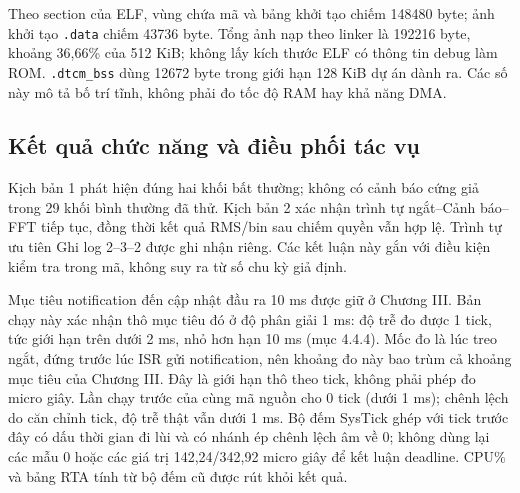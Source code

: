 \documentclass[12pt,a4paper,oneside]{report}
\begin{document}
Theo section của ELF, vùng chứa mã và bảng khởi tạo chiếm 148480 byte; ảnh khởi tạo \texttt{.data} chiếm 43736 byte. Tổng ảnh nạp theo linker là 192216 byte, khoảng 36,66\% của 512 KiB; không lấy kích thước ELF có thông tin debug làm ROM. \texttt{.dtcm\_bss} dùng 12672 byte trong giới hạn 128 KiB dự án dành ra. Các số này mô tả bố trí tĩnh, không phải đo tốc độ RAM hay khả năng DMA.

\subsection{Kết quả chức năng và điều phối tác vụ}
Kịch bản 1 phát hiện đúng hai khối bất thường; không có cảnh báo cứng giả trong 29 khối bình thường đã thử. Kịch bản 2 xác nhận trình tự ngắt--Cảnh báo--FFT tiếp tục, đồng thời kết quả RMS/bin sau chiếm quyền vẫn hợp lệ. Trình tự ưu tiên Ghi log 2--3--2 được ghi nhận riêng. Các kết luận này gắn với điều kiện kiểm tra trong mã, không suy ra từ số chu kỳ giả định.

Mục tiêu notification đến cập nhật đầu ra 10 ms được giữ ở Chương III. Bản chạy này xác nhận thô mục tiêu đó ở độ phân giải 1 ms: độ trễ đo được 1 tick, tức giới hạn trên dưới 2 ms, nhỏ hơn hạn 10 ms (mục 4.4.4). Mốc đo là lúc treo ngắt, đứng trước lúc ISR gửi notification, nên khoảng đo này bao trùm cả khoảng mục tiêu của Chương III. Đây là giới hạn thô theo tick, không phải phép đo micro giây. Lần chạy trước của cùng mã nguồn cho 0 tick (dưới 1 ms); chênh lệch do căn chỉnh tick, độ trễ thật vẫn dưới 1 ms. Bộ đếm SysTick ghép với tick trước đây có dấu thời gian đi lùi và có nhánh ép chênh lệch âm về 0; không dùng lại các mẫu 0 hoặc các giá trị 142,24/342,92 micro giây để kết luận deadline. CPU\% và bảng RTA tính từ bộ đếm cũ được rút khỏi kết quả.
\end{document}
